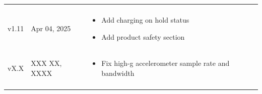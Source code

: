 \begin{longtable}{| >{\centering}p{} | p{} | >{\raggedright\arraybackslash}p{} |}
\begin{itemize}
    \end{itemize}\\
    v1.11 & Apr 04, 2025 &
    \begin{itemize}
        \item Add charging on hold status
        \item Add product safety section
    \end{itemize}\\
    vX.X & XXX XX, XXXX &
    \begin{itemize}
        \item Fix high-g accelerometer sample rate and bandwidth
    \end{itemize}\\
    \arrayrulecolor{gray!50}\hline
\end{longtable}

